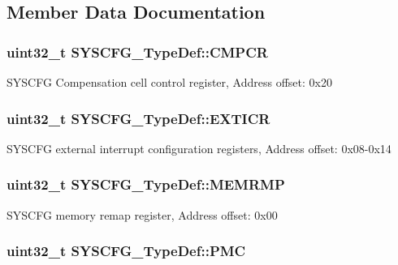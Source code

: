 \subsection{Member Data Documentation}
\hypertarget{struct_s_y_s_c_f_g___type_def_ada13497abc6402300570ff5f430a612e}{
\subsubsection[{C\-M\-P\-C\-R}]{ uint32\-\_\-t S\-Y\-S\-C\-F\-G\-\_\-\-Type\-Def\-::\-C\-M\-P\-C\-R}}\label{struct_s_y_s_c_f_g___type_def_ada13497abc6402300570ff5f430a612e}
S\-Y\-S\-C\-F\-G Compensation cell control register, Address offset\-: 0x20 \hypertarget{struct_s_y_s_c_f_g___type_def_a348aafac7a09a6e93e73e5acbccc34d3}{
\subsubsection[{E\-X\-T\-I\-C\-R}]{ uint32\-\_\-t S\-Y\-S\-C\-F\-G\-\_\-\-Type\-Def\-::\-E\-X\-T\-I\-C\-R}}\label{struct_s_y_s_c_f_g___type_def_a348aafac7a09a6e93e73e5acbccc34d3}
S\-Y\-S\-C\-F\-G external interrupt configuration registers, Address offset\-: 0x08-\/0x14 \hypertarget{struct_s_y_s_c_f_g___type_def_a85b9d3df2274b730327b181c402a7bf5}{
\subsubsection[{M\-E\-M\-R\-M\-P}]{ uint32\-\_\-t S\-Y\-S\-C\-F\-G\-\_\-\-Type\-Def\-::\-M\-E\-M\-R\-M\-P}}\label{struct_s_y_s_c_f_g___type_def_a85b9d3df2274b730327b181c402a7bf5}
S\-Y\-S\-C\-F\-G memory remap register, Address offset\-: 0x00 \hypertarget{struct_s_y_s_c_f_g___type_def_ab5c47c570566cb8ff9d0436c17cc9241}{
\subsubsection[{P\-M\-C}]{ uint32\-\_\-t S\-Y\-S\-C\-F\-G\-\_\-\-Type\-Def\-::\-P\-M\-C}}\label{struct_s_y_s_c_f_g___type_def_ab5c47c570566cb8ff9d0436c17cc9241}
